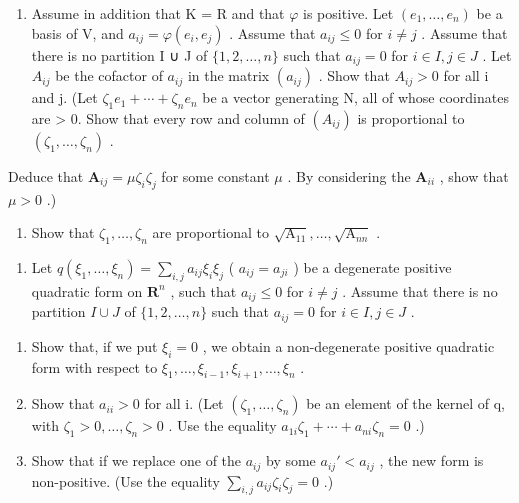 \begin{enumerate}
\def\labelenumi{\alph{enumi})}
\setcounter{enumi}{1}
\tightlist
\item
  Assume in addition that K = R and that \(\varphi\) is positive. Let \((e_{1},\ldots,e_{n})\) be a basis of V, and \(a_{ij} = \varphi(e_{i},e_{j})\) . Assume that \(a_{ij} \leqslant 0\) for \(i \neq j\) . Assume that there is no partition I ∪ J of \(\{1,2,\ldots,n\}\) such that \(a_{ij} = 0\) for \(i \in I, j \in J\) . Let \(A_{ij}\) be the cofactor of \(a_{ij}\) in the matrix \((a_{ij})\) . Show that \(A_{ij} > 0\) for all i and j. (Let \(\zeta_{1}e_{1} + \cdots + \zeta_{n}e_{n}\) be a vector generating N, all of whose coordinates are \textgreater{} 0. Show that every row and column of \((A_{ij})\) is proportional to \((\zeta_{1},\ldots,\zeta_{n})\) .
\end{enumerate}

Deduce that \(\mathbf{A}_{ij} = \mu \zeta_i\zeta_j\) for some constant \(\mu\) . By considering the \(\mathbf{A}_{ii}\) , show that \(\mu > 0\) .)

\begin{enumerate}
\def\labelenumi{\alph{enumi})}
\setcounter{enumi}{2}
\tightlist
\item
  Show that \(\zeta_1, \ldots, \zeta_n\) are proportional to \(\sqrt{\mathrm{A}_{11}}, \ldots, \sqrt{\mathrm{A}_{nn}}\) .
\end{enumerate}

\begin{enumerate}
\def\labelenumi{\arabic{enumi})}
\setcounter{enumi}{6}
\tightlist
\item
  Let \(q(\xi_1, \ldots, \xi_n) = \sum_{i,j} a_{ij} \xi_i \xi_j\) ( \(a_{ij} = a_{ji}\) ) be a degenerate positive quadratic form on \(\mathbf{R}^n\) , such that \(a_{ij} \leqslant 0\) for \(i \neq j\) . Assume that there is no partition \(I \cup J\) of \(\{1, 2, \ldots, n\}\) such that \(a_{ij} = 0\) for \(i \in I, j \in J\) .
\end{enumerate}

\begin{enumerate}
\def\labelenumi{\alph{enumi})}
\item
  Show that, if we put \(\xi_{i}=0\) , we obtain a non-degenerate positive quadratic form with respect to \(\xi_{1},\ldots,\xi_{i-1},\xi_{i+1},\ldots,\xi_{n}\) .
\item
  Show that \(a_{ii} > 0\) for all i. (Let \((\zeta_{1}, \ldots, \zeta_{n})\) be an element of the kernel of q, with \(\zeta_{1} > 0, \ldots, \zeta_{n} > 0\) . Use the equality \(a_{1i}\zeta_{1} + \cdots + a_{ni}\zeta_{n} = 0\) .)
\item
  Show that if we replace one of the \(a_{ij}\) by some \(a_{ij}' < a_{ij}\) , the new form is non-positive. (Use the equality \(\sum_{i,j} a_{ij} \zeta_i \zeta_j = 0\) .)
\end{enumerate}

